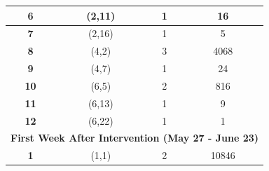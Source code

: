 \begin{table}
\begin{tabular}{cccc}
\textbf{6}              & (2,11)                                                                     & 1                                                                           & 16                                                                             \\ \hline
\textbf{7}              & (2,16)                                                                     & 1                                                                           & 5                                                                              \\ \hline
\textbf{8}              & (4,2)                                                                      & 3                                                                           & 4068                                                                           \\ \hline
\textbf{9}              & (4,7)                                                                      & 1                                                                           & 24                                                                             \\ \hline
\textbf{10}             & (6,5)                                                                      & 2                                                                           & 816                                                                            \\ \hline
\textbf{11}             & (6,13)                                                                     & 1                                                                           & 9                                                                              \\ \hline
\textbf{12}             & (6,22)                                                                     & 1                                                                           & 1                                                                              \\ \hline
\multicolumn{4}{c}{\cellcolor[HTML]{ECF4FF}\textbf{First Week After Intervention (May 27 - June 23)}}                                                                                                                                                               \\ \hline
\textbf{1}              & (1,1)                                                                      & 2                                                                           & 10846                                                                          \\ \hline

\end{tabular}
\end{table}
